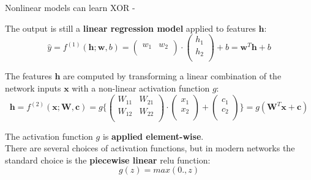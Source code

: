 \begin{frame}[t,allowframebreaks]{Nonlinear models can learn XOR -}
    \framebreak

    The output is still a {\bf linear regression model} 
    applied to features $\mathbf{h}$:\\
    \begin{equation}
        \hat{y} = 
        f^{(1)}(\mathbf{h};\mathbf{w},b) = 
        \begin{pmatrix}
            w_1 & w_2 \\
        \end{pmatrix} 
        \cdot
        \begin{pmatrix}
            h_1 \\ 
            h_2 \\
        \end{pmatrix} 
        + b =
        \mathbf{w}^{T} \mathbf{h} + b 
        \label{eq:learn_xor_nonlinear_model_out}
    \end{equation}

    The features $\mathbf{h}$ are computed by transforming a linear combination 
    of the network inputs $\mathbf{x}$ with a non-linear activation function $g$:
    \begin{equation}
        \mathbf{h} = 
        f^{(2)}(\mathbf{x};\mathbf{W},\mathbf{c}) = 
        g\Bigg\{
            \begin{pmatrix}
                W_{11} & W_{21} \\
                W_{12} & W_{22} \\
            \end{pmatrix} 
            \cdot
            \begin{pmatrix}
                x_1 \\ 
                x_2 \\
            \end{pmatrix} 
            + 
            \begin{pmatrix}
                c_1 \\ 
                c_2 \\
            \end{pmatrix}
        \Bigg\} =
        g(\mathbf{W}^{T} \mathbf{x} + \mathbf{c})
        \label{eq:learn_xor_nonlinear_model_activation}
    \end{equation}

    The activation function $g$ is {\bf applied element-wise}.\\ 
    \vspace{0.2cm}
    There are several choices of activation functions, 
    but in modern networks the standard choice is the 
    {\bf piecewise linear} \gls{relu} function:
    \begin{equation}
        g(z) = max(0.,z)
        \label{eq:learn_xor_nonlinear_model_activation_relu}
    \end{equation}


\end{frame}
